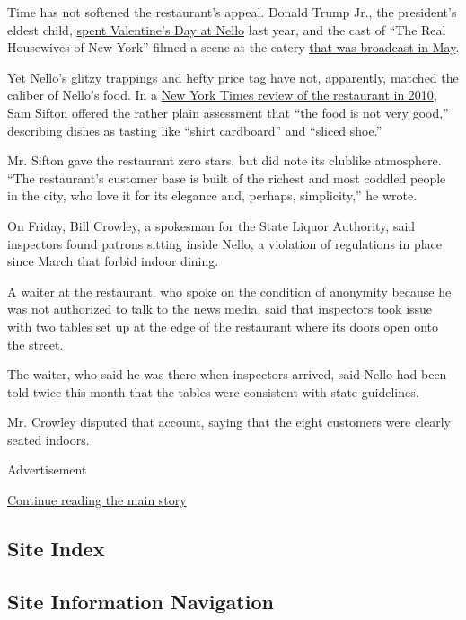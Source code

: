 Time has not softened the restaurant's appeal. Donald Trump Jr., the
president's eldest child,
\href{https://www.instagram.com/p/Bt4w89HA8Hv/?utm_source=ig_embed}{spent
Valentine's Day at Nello} last year, and the cast of ``The Real
Housewives of New York'' filmed a scene at the eatery
\href{https://www.vulture.com/2020/05/real-housewives-of-new-york-city-recap-season-12-episode-6.html}{that
was broadcast in May}.

Yet Nello's glitzy trappings and hefty price tag have not, apparently,
matched the caliber of Nello's food. In a
\href{https://www.nytimes.com/2010/04/14/dining/reviews/14rest.html}{New
York Times review of the restaurant in 2010}, Sam Sifton offered the
rather plain assessment that ``the food is not very good,'' describing
dishes as tasting like ``shirt cardboard'' and ``sliced shoe.''

Mr. Sifton gave the restaurant zero stars, but did note its clublike
atmosphere. ``The restaurant's customer base is built of the richest and
most coddled people in the city, who love it for its elegance and,
perhaps, simplicity,'' he wrote.

On Friday, Bill Crowley, a spokesman for the State Liquor Authority,
said inspectors found patrons sitting inside Nello, a violation of
regulations in place since March that forbid indoor dining.

A waiter at the restaurant, who spoke on the condition of anonymity
because he was not authorized to talk to the news media, said that
inspectors took issue with two tables set up at the edge of the
restaurant where its doors open onto the street.

The waiter, who said he was there when inspectors arrived, said Nello
had been told twice this month that the tables were consistent with
state guidelines.

Mr. Crowley disputed that account, saying that the eight customers were
clearly seated indoors.

Advertisement

\protect\hyperlink{after-bottom}{Continue reading the main story}

\hypertarget{site-index}{%
\subsection{Site Index}\label{site-index}}

\hypertarget{site-information-navigation}{%
\subsection{Site Information
Navigation}\label{site-information-navigation}}

